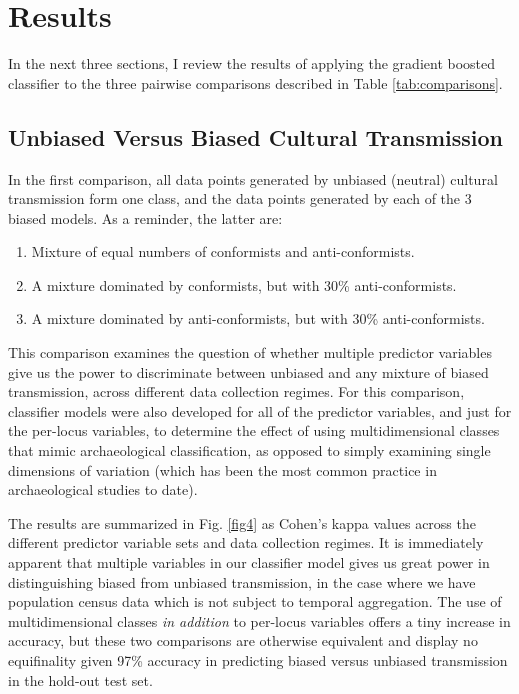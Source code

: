 \section{Results}\label{results}

In the next three sections, I review the results of applying the gradient boosted classifier to the three pairwise comparisons described in Table \ref{tab:comparisons}.  

\subsection{Unbiased Versus Biased Cultural
Transmission}\label{unbiased-versus-biased-cultural-transmission}

In the first comparison, all data points generated by unbiased (neutral) cultural transmission form one class, and the data points generated by each of the 3 biased models.  As a reminder, the latter are:

\begin{enumerate}
\def\labelenumi{\arabic{enumi}.}
\itemsep1pt\parskip0pt
\item
  Mixture of equal numbers of conformists and anti-conformists.
\item
  A mixture dominated by conformists, but with 30\% anti-conformists.
\item
  A mixture dominated by anti-conformists, but with 30\%
  anti-conformists.
\end{enumerate}

This comparison examines the question of whether multiple predictor variables give us the power to discriminate between unbiased and any mixture of biased transmission, across different data collection regimes.  For this comparison, classifier models were also developed for all of the predictor variables, and just for the per-locus variables, to determine the effect of using multidimensional classes that mimic archaeological classification, as opposed to simply examining single dimensions of variation (which has been the most common practice in archaeological studies to date).  

The results are summarized in Fig. \ref{fig4} as Cohen's kappa values across the different predictor variable sets and data collection regimes.  It is immediately apparent that multiple variables in our classifier model gives us great power in distinguishing biased from unbiased transmission, in the case where we have population census data which is not subject to temporal aggregation.  The use of multidimensional classes \emph{in addition} to per-locus variables offers a tiny increase in accuracy, but these two comparisons are otherwise equivalent and display no equifinality given 97\% accuracy in predicting biased versus unbiased transmission in the hold-out test set.  


